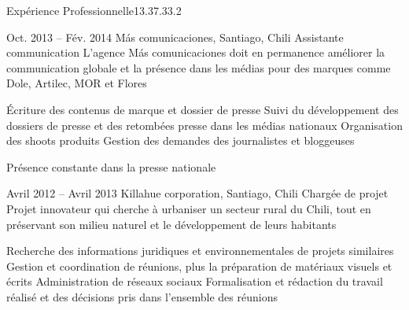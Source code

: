 \documentclass[30pt, french]{tccv}
\begin{document}
\begin{upshape}
\begin{flat_frame}{Expérience Professionnelle}{13.3}{7.3}{3.2}{}
\begin{eventlist}
\setlength{\parskip}{0pt}    
\item{Oct. 2013 -- Fév. 2014 }     
  {Más comunicaciones, Santiago, Chili}     
  {Assistante communication}
     \fontsize{9pt}{1em}\color{text}\bodyfontlight\upshape\selectfont
%    
 L’agence Más comunicaciones doit en permanence améliorer la communication globale et la présence dans les médias
pour des marques comme Dole, Artilec, MOR et Flores\\

\setlength{\parskip}{-10pt}
\begin{itemize}
      \setlength\itemsep{-3pt} 
      \cvitem[\checkmark]  Écriture des contenus de marque et dossier de presse                                        
      \cvitem[\checkmark]  Suivi du développement des dossiers de presse et des retombées presse dans les médias nationaux                                             
      \cvitem[\checkmark]  Organisation des shoots produits 
      \cvitem[\checkmark]  Gestion des demandes des journalistes et bloggeuses 

\end{itemize}       
 Présence constante dans la presse nationale
\vspace{0.5cm}




\setlength{\parskip}{0pt}
\item{Avril 2012 -- Avril 2013 }     
  {Killahue corporation, Santiago, Chili}     
  {Chargée de projet}
\fontsize{9pt}{1em}\color{text}\bodyfontlight\upshape\selectfont
%
 Projet innovateur qui cherche à urbaniser un secteur rural du Chili, tout en préservant son milieu naturel et le développement de leurs habitants \\
     
\setlength{\parskip}{-10pt}
\begin{itemize}
      \setlength\itemsep{-3pt} 
      \cvitem[\checkmark] Recherche des informations juridiques et environnementales de projets similaires          
      \cvitem[\checkmark] Gestion et coordination de réunions, plus la préparation de matériaux visuels et écrits   
      \cvitem[\checkmark] Administration de réseaux sociaux                                                                    
      \cvitem[\checkmark] Formalisation et rédaction du travail réalisé et des décisions pris dans l’ensemble des réunions     
\end{itemize}      


\end{eventlist}
\end{flat_frame}
\end{upshape}
\end{document}
